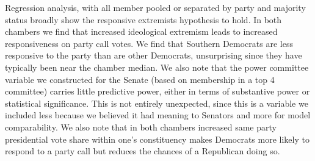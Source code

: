 \documentclass[12pt]{article}
\begin{document}
Regression analysis, with all member pooled or separated by party and majority status broadly show the responsive extremists hypothesis to hold. In both chambers we find that increased ideological extremism leads to increased responsiveness on party call votes. We find that Southern Democrats are less responsive to the party than are other Democrats, unsurprising since they have typically been near the chamber median. We also note that the power committee variable we constructed for the Senate (based on membership in a top 4 committee) carries little predictive power, either in terms of substantive power or statistical significance. This is not entirely unexpected, since this is a variable we included less because we believed it had meaning to Senators and more for model comparability. We also note that in both chambers increased same party presidential vote share within one's constituency makes Democrats more likely to respond to a party call but reduces the chances of a Republican doing so.
\end{document}
